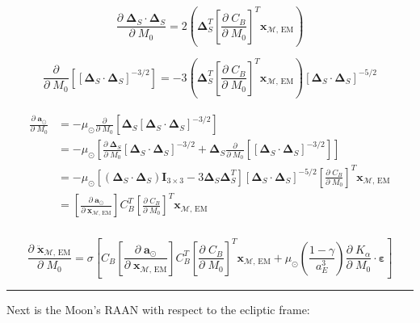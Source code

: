 \documentclass[]{article}
\newcommand{\pd}[2]{\frac{\partial\;#1}{\partial\;#2}}
\newcommand{\pddown}[2]{\frac{\partial}{\partial\;#2} \left[ #1 \right] }
\begin{document}
	\begin{equation*}
		\pd{\boldsymbol{\Delta}_S \cdot \boldsymbol{\Delta}_S}{M_0} = 2\left( \boldsymbol{\Delta}_S^T \left[ \pd{C_B}{M_0} \right]^T \mathbf{x}_{\mathcal{M}\text{, EM}} \right)
	\end{equation*}
	
	\begin{equation*}
		\pddown{ [\boldsymbol{\Delta}_S \cdot \boldsymbol{\Delta}_S]^{-3/2} }{M_0} = -3 \left( \boldsymbol{\Delta}_S^T \left[ \pd{C_B}{M_0} \right]^T \mathbf{x}_{\mathcal{M}\text{, EM}} \right) [\boldsymbol{\Delta}_S \cdot \boldsymbol{\Delta}_S]^{-5/2}
	\end{equation*}
	
	\begin{align}
	\begin{split}
		\pd{\mathbf{a}_{\odot}}{M_0} 
		&= -\mu_\odot \pddown{ \boldsymbol{\Delta}_S [\boldsymbol{\Delta}_S \cdot \boldsymbol{\Delta}_S]^{-3/2} }{M_0} \\
		&= -\mu_\odot \left[ \pd{ \boldsymbol{\Delta}_S }{M_0}[\boldsymbol{\Delta}_S \cdot \boldsymbol{\Delta}_S]^{-3/2} + \boldsymbol{\Delta}_S  \pddown{ [\boldsymbol{\Delta}_S \cdot \boldsymbol{\Delta}_S]^{-3/2} }{M_0} \right] \\
		&= -\mu_\odot \left[ (\boldsymbol{\Delta}_S \cdot \boldsymbol{\Delta}_S)\mathbf{I}_{3\times 3} - 3 \boldsymbol{\Delta}_S \boldsymbol{\Delta}_S^T \right] [\boldsymbol{\Delta}_S \cdot \boldsymbol{\Delta}_S]^{-5/2} \left[ \pd{C_B}{M_0} \right]^T \mathbf{x}_{\mathcal{M}\text{, EM}} \\
		&= \left[\pd{\mathbf{a}_{\odot}}{ \mathbf{x}_{\mathcal{M}\text{, EM}} }\right] C_B^T \left[ \pd{C_B}{M_0} \right]^T \mathbf{x}_{\mathcal{M}\text{, EM}} \\
	\end{split}
	\end{align}
	
	\begin{equation}
		\pd{\ddot{\mathbf{x}}_{\mathcal{M}\text{, EM}}}{M_0} = \sigma \left[ C_B  \left[\pd{\mathbf{a}_{\odot}}{ \mathbf{x}_{\mathcal{M}\text{, EM}} }\right] C_B^T \left[ \pd{C_B}{M_0} \right]^T \mathbf{x}_{\mathcal{M}\text{, EM}} + \mu_\odot \left(\frac{1-\gamma}{a_E^3}\right) \pd{K_\alpha}{M_0} \cdot \boldsymbol{\varepsilon} \right]
	\end{equation}
	
	\hrule \vspace{1em}
	
	Next is the Moon's RAAN with respect to the ecliptic frame:
	
\end{document}
